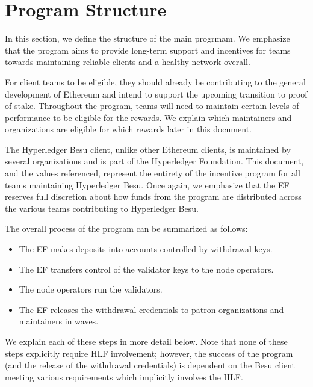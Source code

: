 
\section{Program Structure} \label{sec:structure}
In this section, we define the structure of the main progrmam.  We emphasize that the program aims to provide long-term support and incentives for teams towards maintaining reliable clients and a healthy network overall.

For client teams to be eligible, they should already be contributing to the general development of Ethereum and intend to support the upcoming transition to proof of stake. Throughout the program, teams will need to maintain certain levels of performance to be eligible for the rewards.  We explain which maintainers and organizations are eligible for which rewards later in this document.

The Hyperledger Besu client, unlike other Ethereum clients, is maintained by several organizations and is part of the Hyperledger Foundation. This document, and the values referenced, represent the entirety of the incentive program for all teams maintaining Hyperledger Besu. Once again, we emphasize that the EF reserves full discretion about how funds from the program are distributed across the various teams contributing to Hyperledger Besu.

The overall process of the program can be summarized as follows:
\begin{itemize}
\item The EF makes deposits into accounts controlled by withdrawal keys.
\item The EF transfers control of the validator keys to the node operators.
\item The node operators run the validators.
\item The EF releases the withdrawal credentials to patron organizations and maintainers in waves.
\end{itemize}

We explain each of these steps in more detail below.  Note that none of these steps explicitly require HLF involvement; however, the success of the program (and the release of the withdrawal credentials) is dependent on the Besu client meeting various requirements which implicitly involves the HLF.

